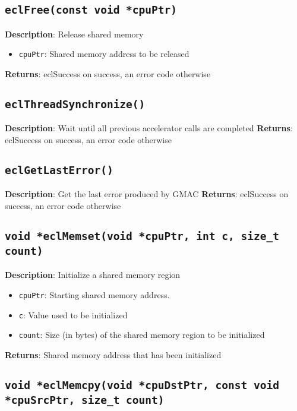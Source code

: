 \subsection{\texttt{eclFree(const void *cpuPtr)}}

\textbf{Description}: Release shared memory
\begin{itemize}
  \item \texttt{cpuPtr}: Shared memory address to be released
\end{itemize}
\textbf{Returns}: eclSuccess on success, an error code otherwise

\subsection{\texttt{eclThreadSynchronize()}}

\textbf{Description}: Wait until all previous accelerator calls are completed
\textbf{Returns}: eclSuccess on success, an error code otherwise

\subsection{\texttt{eclGetLastError()}}

\textbf{Description}: Get the last error produced by GMAC
\textbf{Returns}: eclSuccess on success, an error code otherwise

\subsection{\texttt{void *eclMemset(void *cpuPtr, int c, size\_t count)}}

\textbf{Description}: Initialize a shared memory region
\begin{itemize}
  \item \texttt{cpuPtr}: Starting shared memory address.
  \item \texttt{c}: Value used to be initialized
  \item \texttt{count}: Size (in bytes) of the shared memory region to be initialized
\end{itemize}
\textbf{Returns}: Shared memory address that has been initialized

\subsection{\texttt{void *eclMemcpy(void *cpuDstPtr, const void *cpuSrcPtr, size\_t count)}}

